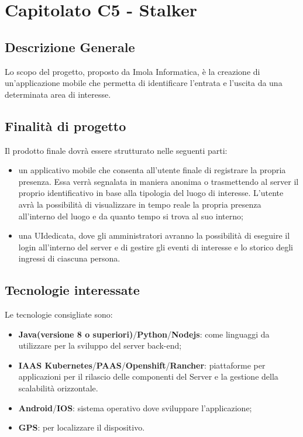 \section{Capitolato C5 - Stalker}
\subsection{Descrizione Generale}
Lo scopo del progetto, proposto da Imola Informatica, è la creazione di un'applicazione mobile che permetta di identificare l'entrata e l'uscita da una determinata area di interesse.
\subsection{Finalità di progetto}
Il prodotto finale dovrà essere strutturato nelle seguenti parti:
\begin{itemize}
	\item un applicativo mobile che consenta all'utente finale di registrare la propria presenza. Essa verrà segnalata in maniera anonima o trasmettendo al server il proprio identificativo in base alla tipologia del luogo di interesse. L'utente avrà la possibilità di visualizzare in tempo reale la propria presenza all'interno del luogo e da quanto tempo si trova al suo interno;
	\item una UI\glo dedicata, dove gli amministratori avranno la possibilità di eseguire il login all'interno del server e di gestire gli eventi di interesse e lo storico degli ingressi di ciascuna persona.
\end{itemize}
\subsection{Tecnologie interessate}
Le tecnologie consigliate sono:
\begin{itemize} %
	\item \textbf{Java\glo(versione 8 o superiori)}/\textbf{Python\glo}/\textbf{Nodejs\glo}: come linguaggi da utilizzare per la sviluppo del server back-end;
	\item \textbf{IAAS Kubernetes\glo}/\textbf{PAAS\glo}/\textbf{Openshift\glo}/\textbf{Rancher\glo}: piattaforme per applicazioni per il rilascio delle componenti del Server e la gestione della scalabilità orizzontale.
	\item \textbf{Android\glo}/\textbf{IOS\glo}: sistema operativo dove sviluppare l'applicazione;
	\item \textbf{GPS\glo}: per localizzare il dispositivo.
\end{itemize}
